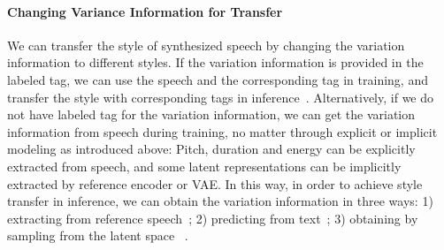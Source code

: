 \documentclass{article}
\begin{document}
\paragraph{Changing Variance Information for Transfer} We can transfer the style of synthesized speech by changing the variation information to different styles. If the variation information is provided in the labeled tag, we can use the speech and the corresponding tag in training, and transfer the style with corresponding tags in inference~\cite{zhang2019learning,nekvinda2020one,li2021controllable,chen2020multispeech}. Alternatively, if we do not have labeled tag for the variation information, we can get the variation information from speech during training, no matter through explicit or implicit modeling as introduced above: Pitch, duration and energy can be explicitly extracted from speech, and some latent representations can be implicitly extracted by reference encoder or VAE. In this way, in order to achieve style transfer in inference, we can obtain the variation information in three ways: 1) extracting from reference speech~\cite{skerry2018towards,wang2018style,jia2018transfer,zhang2019learningb,choi2020attentron,chen2021adaspeech,xue2021cycle,an2021improving}; 2) predicting from text~\cite{stanton2018predicting,ren2019fastspeech,sun2020generating,zeng2020prosody,ren2021fastspeech,chen2021adaspeech}; 3) obtaining by sampling from the latent space ~\cite{wang2018style,zhang2019learningb,hsu2018hierarchical}. 


\iffalse
\end{document}
